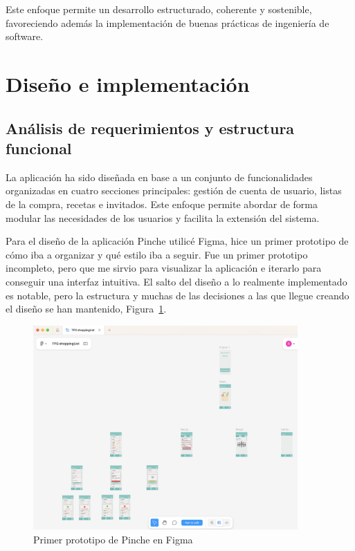 Este enfoque permite un desarrollo estructurado, coherente y sostenible, favoreciendo además la implementación de buenas prácticas de ingeniería de software.

\section{Diseño e implementación}
\label{sec:diseno-implementacion}

\subsection{Análisis de requerimientos y estructura funcional}

La aplicación ha sido diseñada en base a un conjunto de funcionalidades organizadas en cuatro secciones principales: gestión de cuenta de usuario, listas de la compra, recetas e invitados. Este enfoque permite abordar de forma modular las necesidades de los usuarios y facilita la extensión del sistema.

Para el diseño de la aplicación Pinche utilicé Figma, hice un primer prototipo de cómo iba a organizar y qué estilo iba a seguir. Fue un primer prototipo incompleto, pero que me sirvio para visualizar la aplicación e iterarlo para conseguir una interfaz intuitiva. El salto del diseño a lo realmente implementado es notable, pero la estructura y muchas de las decisiones a las que llegue creando el diseño se han mantenido, Figura~\ref{fig:pincheFigma}.

\begin{figure}[H]
\centering
\includegraphics[width=0.9\textwidth]{./img/description/pinche_figma.png}
\caption{Primer prototipo de Pinche en Figma}
\label{fig:pincheFigma}
\end{figure}

